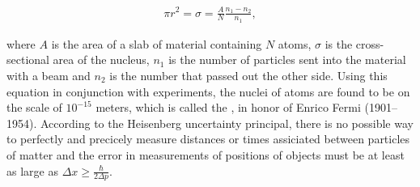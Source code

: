 \begin{align}
 \pi r^2 = \sigma = \frac{A}{N}\frac{n_1-n_2}{n_1},
\end{align}

where $A$ is the area of a slab of material containing $N$ atoms, $\sigma$ is the cross-sectional area of the nucleus, $n_1$ is the number of particles sent into the material with a beam and $n_2$ is the number that passed out the other side. Using this equation in conjunction with experiments, the nuclei of atoms are found to be on the scale of $10^{-15}$ meters, which is called the , in honor of Enrico Fermi (1901–1954). According to the Heisenberg uncertainty principal, there is no possible way to perfectly and precicely measure distances or times assiciated between particles of matter and the error in measurements of positions of objects must be at least as large as $\Delta x \geq \frac{\hbar}{2\Delta p}$.





%






